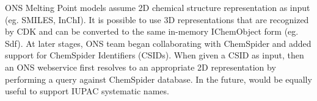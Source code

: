 \documentclass[12pt,letterpaper]{article}
\begin{document}
ONS Melting Point models assume 2D chemical structure representation as input
(eg. SMILES, InChI). It is possible to use 3D representations that are recognized
by CDK and can be converted to the same in-memory IChemObject form (eg. Sdf).
At later stages, ONS team began collaborating with ChemSpider and added support
for ChemSpider Identifiers (CSIDs). When given a CSID as input, then an ONS
webservice first resolves to an appropriate 2D representation by performing a
query against ChemSpider database. In the future, would be equally useful to 
support IUPAC systematic names. 


\end{document}
